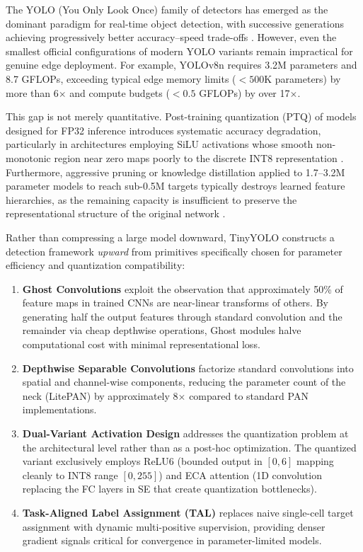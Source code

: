 \documentclass[article,submit,moreauthors,pdftex,10pt,a4paper]{article}
\begin{document}
The YOLO (You Only Look Once) family of detectors has emerged as the dominant paradigm for real-time object detection, with successive generations achieving progressively better accuracy--speed trade-offs \cite{redmon2016you, redmon2017yolo9000, redmon2018yolov3, bochkovskiy2020yolov4, ge2021yolox, li2022yolov6, wang2023yolov7, jocher2023yolov8, wang2024yolov10, tian2025yolo12, shao2025yolo26}. However, even the smallest official configurations of modern YOLO variants remain impractical for genuine edge deployment. For example, YOLOv8n requires 3.2M parameters and 8.7 GFLOPs, exceeding typical edge memory limits ($<500$K parameters) by more than 6$\times$ and compute budgets ($<0.5$ GFLOPs) by over 17$\times$.

This gap is not merely quantitative. Post-training quantization (PTQ) of models designed for FP32 inference introduces systematic accuracy degradation, particularly in architectures employing SiLU activations whose smooth non-monotonic region near zero maps poorly to the discrete INT8 representation \cite{krishnamoorthi2018quantizing, nagel2021white}. Furthermore, aggressive pruning or knowledge distillation applied to 1.7--3.2M parameter models to reach sub-0.5M targets typically destroys learned feature hierarchies, as the remaining capacity is insufficient to preserve the representational structure of the original network \cite{liu2019rethinking, he2019filter}.

Rather than compressing a large model downward, TinyYOLO constructs a detection framework \textit{upward} from primitives specifically chosen for parameter efficiency and quantization compatibility:
\begin{enumerate}
\item \textbf{Ghost Convolutions} \cite{han2020ghostnet} exploit the observation that approximately 50\% of feature maps in trained CNNs are near-linear transforms of others. By generating half the output features through standard convolution and the remainder via cheap depthwise operations, Ghost modules halve computational cost with minimal representational loss.
\item \textbf{Depthwise Separable Convolutions} \cite{howard2017mobilenets} factorize standard convolutions into spatial and channel-wise components, reducing the parameter count of the neck (LitePAN) by approximately 8$\times$ compared to standard PAN implementations.
\item \textbf{Dual-Variant Activation Design} addresses the quantization problem at the architectural level rather than as a post-hoc optimization. The quantized variant exclusively employs ReLU6 (bounded output in $[0, 6]$ mapping cleanly to INT8 range $[0, 255]$) and ECA attention (1D convolution replacing the FC layers in SE that create quantization bottlenecks).
\item \textbf{Task-Aligned Label Assignment (TAL)} \cite{feng2021tood} replaces naive single-cell target assignment with dynamic multi-positive supervision, providing denser gradient signals critical for convergence in parameter-limited models.
\end{enumerate}
\end{document}
